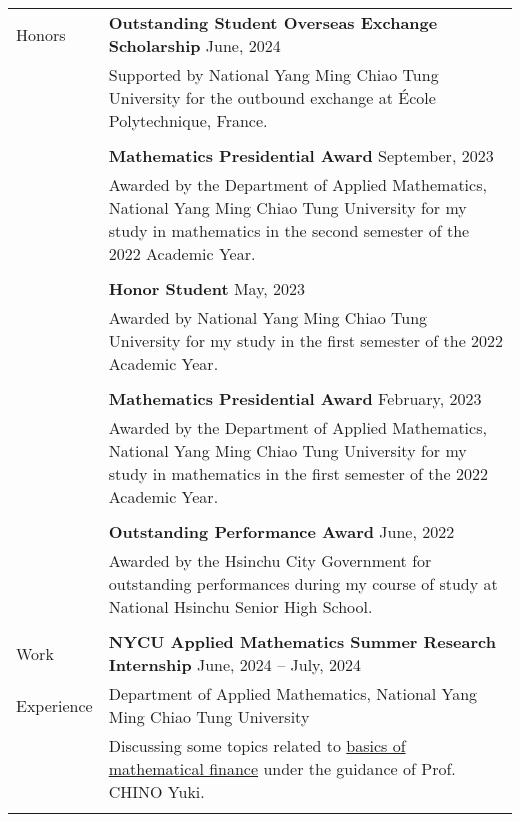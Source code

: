 \documentclass[letterpaper, 11pt]{article}
\begin{document}
\begin{center}
\begin{longtable}{p{0.76in}p{5.93in}}
        {\textcolor{OliveGreen}{Honors}} & \textbf{Outstanding Student Overseas Exchange Scholarship} \hfill June, 2024\\
        & Supported by National Yang Ming Chiao Tung University for the outbound exchange at \'Ecole Polytechnique, France. \\
        & \\
        & \textbf{Mathematics Presidential Award} \hfill September, 2023\\
        & Awarded by the Department of Applied Mathematics, National Yang Ming Chiao Tung University for my study in mathematics in the second semester of the 2022 Academic Year.\\
        & \\
        & \textbf{Honor Student} \hfill May, 2023\\
        & Awarded by National Yang Ming Chiao Tung University for my study in the first semester of the 2022 Academic Year. \\
        & \\
        & \textbf{Mathematics Presidential Award} \hfill February, 2023\\
        & Awarded by the Department of Applied Mathematics, National Yang Ming Chiao Tung University for my study in mathematics in the first semester of the 2022 Academic Year.\\
        & \\
        & \textbf{Outstanding Performance Award} \hfill June, 2022\\
        & Awarded by the Hsinchu City Government for outstanding performances during my course of study at National Hsinchu Senior High School.\\
        & \\
        
        
        {\textcolor{OliveGreen}{Work}} & \textbf{NYCU Applied Mathematics Summer Research Internship} \hfill June, 2024 -- July, 2024 \\
        {\textcolor{OliveGreen}{Experience}} & Department of Applied Mathematics, National Yang Ming Chiao Tung University \\
        & Discussing some topics related to \href{https://hackmd.io/@eiken-sc11/B1QcaW3B0}{basics of mathematical finance} under the guidance of Prof. CHINO Yuki.\\
        & \\
        

\end{longtable}
\end{center}
\end{document}
